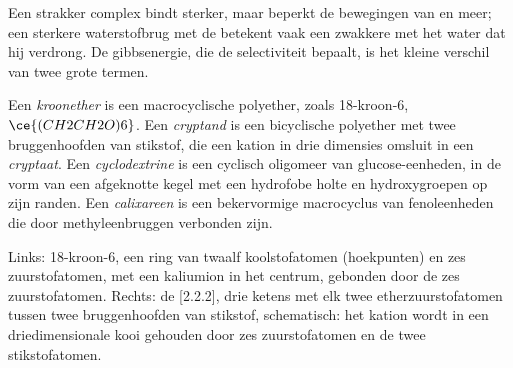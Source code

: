 Een strakker complex bindt sterker, maar beperkt de bewegingen van
 en  meer; een sterkere waterstofbrug met de  betekent
vaak een zwakkere met het water dat hij verdrong. De gibbsenergie, die de
selectiviteit bepaalt, is het kleine verschil van twee grote termen.

\begin{definition}[Gastheren]\label{def:b3:supramolecular:hosts}
Een \emph{kroonether} is een macrocyclische polyether,
zoals
18-kroon-6, $\ce{(CH2CH2O)6}$. Een \emph{cryptand} is een
bicyclische polyether met twee bruggenhoofden van stikstof, die een
kation in drie dimensies omsluit in een \emph{cryptaat}.
Een \emph{cyclodextrine} is een cyclisch oligomeer
van glucose-eenheden, in de vorm van een afgeknotte kegel met een
hydrofobe holte en hydroxygroepen op zijn randen. Een
\emph{calixareen} is een bekervormige macrocyclus van
fenoleenheden die door methyleenbruggen verbonden zijn.
\end{definition}

\begin{omfigure}

{\small Links: 18-kroon-6, een ring van twaalf koolstofatomen
(hoekpunten) en zes zuurstofatomen, met een kaliumion in het centrum,
gebonden door de zes zuurstofatomen. Rechts: de
[2.2.2], drie ketens met elk twee etherzuurstofatomen tussen twee
bruggenhoofden van stikstof, schematisch: het kation wordt in een
driedimensionale kooi gehouden door zes zuurstofatomen en de twee
stikstofatomen.}
\end{omfigure}

